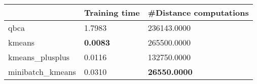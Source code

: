 \begin{table}[htbp]
\centering
\begin{tabular}{lll}
\toprule
 & Training time & #Distance computations \\
\midrule
qbca & 1.7983 & 236143.0000 \\
kmeans & \textbf{0.0083} & 265500.0000 \\
kmeans_plusplus & 0.0116 & 132750.0000 \\
minibatch_kmeans & 0.0310 & \textbf{26550.0000} \\
\bottomrule
\end{tabular}
\end{table}
